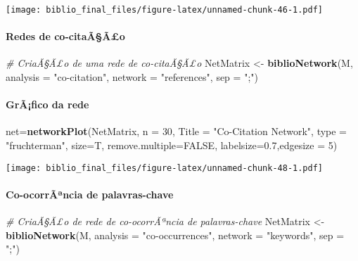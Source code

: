 \documentclass[]{article}
\newenvironment{Shaded}{\begin{snugshade}}{\end{snugshade}}
\newcommand{\KeywordTok}[1]{\textcolor[rgb]{0.13,0.29,0.53}{\textbf{#1}}}
\newcommand{\DataTypeTok}[1]{\textcolor[rgb]{0.13,0.29,0.53}{#1}}
\newcommand{\DecValTok}[1]{\textcolor[rgb]{0.00,0.00,0.81}{#1}}
\newcommand{\FloatTok}[1]{\textcolor[rgb]{0.00,0.00,0.81}{#1}}
\newcommand{\StringTok}[1]{\textcolor[rgb]{0.31,0.60,0.02}{#1}}
\newcommand{\CommentTok}[1]{\textcolor[rgb]{0.56,0.35,0.01}{\textit{#1}}}
\newcommand{\OtherTok}[1]{\textcolor[rgb]{0.56,0.35,0.01}{#1}}
\newcommand{\NormalTok}[1]{#1}
\let\oldparagraph\paragraph
\renewcommand{\paragraph}[1]{\oldparagraph{#1}\mbox{}}
\begin{document}
\texttt{[image: biblio\_final\_files/figure-latex/unnamed-chunk-46-1.pdf]}

\paragraph{Redes de co-citaÃ§Ã£o}\label{redes-de-co-citaaao}

\begin{Shaded}
\begin{Highlighting}[]
\CommentTok{# CriaÃ§Ã£o de uma rede de co-citaÃ§Ã£o}
\NormalTok{NetMatrix <-}\StringTok{ }\KeywordTok{biblioNetwork}\NormalTok{(M, }\DataTypeTok{analysis =} \StringTok{"co-citation"}\NormalTok{, }
                           \DataTypeTok{network =} \StringTok{"references"}\NormalTok{, }\DataTypeTok{sep =} \StringTok{";"}\NormalTok{)}
\end{Highlighting}
\end{Shaded}

\paragraph{GrÃ¡fico da rede}\label{grafico-da-rede-1}

\begin{Shaded}
\begin{Highlighting}[]
\NormalTok{net=}\KeywordTok{networkPlot}\NormalTok{(NetMatrix, }\DataTypeTok{n =} \DecValTok{30}\NormalTok{, }\DataTypeTok{Title =} \StringTok{"Co-Citation Network"}\NormalTok{, }
                \DataTypeTok{type =} \StringTok{"fruchterman"}\NormalTok{, }\DataTypeTok{size=}\NormalTok{T, }\DataTypeTok{remove.multiple=}\OtherTok{FALSE}\NormalTok{,}
                \DataTypeTok{labelsize=}\FloatTok{0.7}\NormalTok{,}\DataTypeTok{edgesize =} \DecValTok{5}\NormalTok{)}
\end{Highlighting}
\end{Shaded}

\texttt{[image: biblio\_final\_files/figure-latex/unnamed-chunk-48-1.pdf]}

\paragraph{Co-ocorrÃªncia de
palavras-chave}\label{co-ocorrancia-de-palavras-chave}

\begin{Shaded}
\begin{Highlighting}[]
\CommentTok{# CriaÃ§Ã£o de rede de co-ocorrÃªncia de palavras-chave}
\NormalTok{NetMatrix <-}\StringTok{ }\KeywordTok{biblioNetwork}\NormalTok{(M, }\DataTypeTok{analysis =} \StringTok{"co-occurrences"}\NormalTok{, }\DataTypeTok{network =} \StringTok{"keywords"}\NormalTok{, }\DataTypeTok{sep =} \StringTok{";"}\NormalTok{)}
\end{Highlighting}
\end{Shaded}
\end{document}
